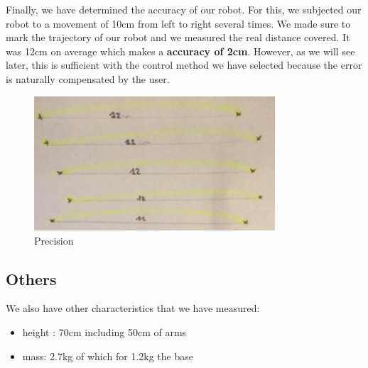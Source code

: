 \hspace{\parindent} Finally, we have determined the accuracy of our robot. For this, we subjected our robot to a movement of 10cm from left to right several times. We made sure to mark the trajectory of our robot and we measured the real distance covered. It was 12cm on average which makes a \textbf{accuracy of 2cm}. However, as we will see later, this is sufficient with the control method we have selected because the error is naturally compensated by the user.
\begin{figure}[ht]
    \centering
    \includegraphics[width=0.8\textwidth]{images/Section04/precision.png}
    \caption{Precision}
    \label{fig:mesh26}
\end{figure}
\FloatBarrier

\subsection{Others}

We also have other characteristics that we have measured:
\begin{itemize}[noitemsep]
    \item height : 70cm including 50cm of arms
    \item mass: 2.7kg of which for 1.2kg the base
\end{itemize}
